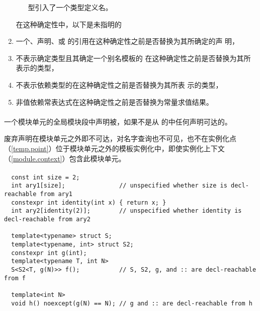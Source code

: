 \begin{enumerate}
\begin{enumerate}
        型引入了一个类型定义名。
    \end{enumerate}
    在这种确定性中，以下是未指明的
  \item 一个、声明、或
    的引用在这种确定性之前是否替换为其所确定的声
    明，
  \item 不表示确定类型且其确定一个别名模板的
    在这种确定性之前是否替换为其所表示的类型，
  \item 不表示依赖类型的在这种确定性之前是否替换为其所表
    示的类型，
  \item 非值依赖常表达式在这种确定性之前是否替换为常量求值结果。
\end{enumerate}

\paragraph{} %
一个模块单元的全局模块段中声明被，如果不是从
的中任何声明可达的。

\begin{note}
  废弃声明在模块单元之外即不可达，对名字查询也不可见，也不在实例化点
  （\ref{temp.point}）位于模块单元之外的模板实例化中，即使实例化上下文
  （\ref{module.context}）包含此模块单元。
\end{note}

\paragraph{} %
\begin{example}
  \begin{lstlisting}
  const int size = 2;
  int ary1[size];               // unspecified whether size is decl-reachable from ary1
  constexpr int identity(int x) { return x; }
  int ary2[identity(2)];        // unspecified whether identity is decl-reachable from ary2

  template<typename> struct S;
  template<typename, int> struct S2;
  constexpr int g(int);
  template<typename T, int N>
  S<S2<T, g(N)>> f();           // S, S2, g, and :: are decl-reachable from f

  template<int N>
  void h() noexcept(g(N) == N); // g and :: are decl-reachable from h
  \end{lstlisting}
\end{example}

